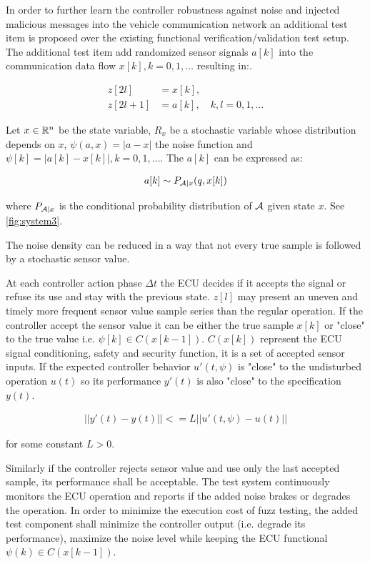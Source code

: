 \documentclass[a4paper, fleqn]{template/cas-dc}
\begin{document}
	In order to further learn the controller robustness against noise and injected malicious messages into the vehicle communication network an additional test item is proposed over the existing functional verification/validation test setup. The additional test item add randomized sensor signals $a[k]$ into the communication data flow $x[k], k=0, 1, \ldots$ resulting in:.
	
	\begin{equation}
		\begin{aligned}
			z[2l] &= x[k], \\
			z[2l+1] &= a[k], \quad k, l = 0, 1, \dots
		\end{aligned}
	\end{equation}
	
	
	Let $x\in\mathbb R^n$ be the state variable, $R_x$ be a stochastic variable whose distribution depends on 
	$x$, $\psi(a, x) = |a-x|$ the noise function and $\psi[k] = |a[k] - x[k]|, k=0,1,\ldots$. The $a[k]$ can be expressed as:
	
	\begin{align}
		a[k] \sim P_{\mathcal{A}|x}(q, x[k])
	\end{align}
	
	where $P_{\mathcal{A}|x}$ is the conditional probability distribution of $\mathcal{A}$ given state $x$. See \autoref{fig:system3}.
	
	The noise density can be reduced in a way that not every true sample is followed by a stochastic sensor value.
	
	At each controller action phase $\Delta t$ the ECU decides if it accepts the signal or refuse its use and stay with the previous state. $z[l]$ may present an uneven and timely more frequent sensor value sample series than the regular operation. If the controller accept the sensor value it can be either the true sample $x[k]$ or "close" to the true value i.e. $\psi[k] \in C(x[k-1])$. $C(x[k])$ represent the ECU signal conditioning, safety and security function, it is a set of accepted sensor inputs. If the expected controller behavior $u'(t, \psi)$ is "close" to the undisturbed operation $u(t)$ so its performance $y'(t)$ is also "close" to the specification $y(t)$. 
	
	\begin{align}
		||y'(t) - y(t)|| <= L||u'(t, \psi) - u(t)||
	\end{align}
	
	for some constant $L>0$.
	
	Similarly if the controller rejects sensor value and use only the last accepted sample, its performance shall be acceptable.
	The test system continuously monitors the ECU operation and reports if the added noise brakes or degrades the operation. 
	In order to minimize the execution cost of fuzz testing, the added test component shall minimize the controller output (i.e. degrade its performance), maximize the noise level while keeping the ECU functional $\psi(k) \in C(x[k-1])$.
	
\end{document}
